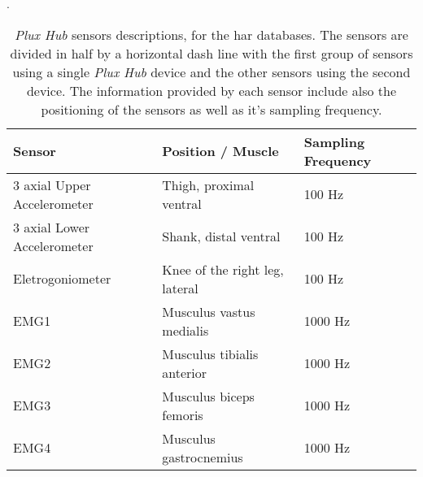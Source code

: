 \begin{table}[ht]
	\caption[\textit{Plux Hub} sensors descriptions, for the \gls{har} database]{\textit{Plux Hub} sensors descriptions, for the \gls{har} databases\cite{Liu2019}. The sensors are divided in half by a horizontal dash line with the first group of sensors using a single \textit{Plux Hub} device and the other sensors using the second device. The information provided by each sensor include also the positioning of the sensors as well as it's sampling frequency.}.
	\label{tab:plux_hubs}
\centering
\begin{tabular}{lll}
	\toprule
	\textbf{Sensor} & 
	\textbf{Position / Muscle} &
	\textbf{Sampling Frequency}\\
    \midrule
3 axial Upper Accelerometer & Thigh, proximal ventral & 100 Hz \\
3 axial Lower Accelerometer & Shank, distal ventral & 100 Hz \\
Eletrogoniometer & Knee of the right leg, lateral & 100 Hz \\
EMG1 & Musculus vastus medialis & 1000 Hz \\
EMG2 & Musculus tibialis anterior & 1000 Hz \\
EMG3 & Musculus biceps femoris & 1000 Hz \\
EMG4 & Musculus gastrocnemius & 1000 Hz \\
\bottomrule
\end{tabular}
\end{table}

